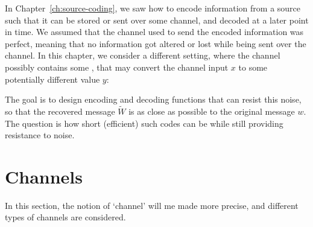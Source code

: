 In Chapter~\ref{ch:source-coding}, we saw how to encode information from a source such that it can be stored or sent over some channel, and decoded at a later point in time. We assumed that the channel used to send the encoded information was perfect, meaning that no information got altered or lost while being sent over the channel. In this chapter, we consider a different setting, where the channel possibly contains some , that may convert the channel input $x$ to some potentially different value $y$:

\begin{figure}[h]
\begin{center}
\end{center}
\end{figure}
The goal is to design encoding and decoding functions that can resist this noise, so that the recovered message $\tilde{W}$ is as close as possible to the original message $w$. The question is how short (efficient) such codes can be while still providing resistance to noise.

\section{Channels}
In this section, the notion of `channel' will me made more precise, and different types of channels are considered.

